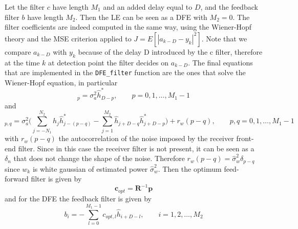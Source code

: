 \documentclass[10pt]{article}
\begin{document}
Let the filter $c$ have length $M_1$ and an added delay equal to $D$, and the feedback filter $b$ have length $M_2$. Then the LE can be seen as a DFE with $M_2 = 0$. The filter coefficients are indeed computed in the same way, using the Wiener-Hopf theory and the MSE criterion applied to $J = E[|a_{k-D} - y_k|^2]$. Note that we compare $a_{k-D}$ with $y_k$ because of the delay D introduced by the c filter, therefore at the time $k$ at detection point the filter decides on $a_{k-D}$. The final equations that are implemented in the \texttt{DFE\_filter} function are the ones that solve the Wiener-Hopf equation, in particular
\begin{equation}
	[\mathbf{p}]_p = \sigma_a^2 \hat{h}^*_{D-p}, \quad \quad p = 0, 1, \dots, M_1 - 1
\end{equation}
and
\begin{equation}
	[\mathbf{R}]_{p, q} = \sigma_a^2 \bigg(\sum_{j = -N_1}^{N_2}\hat{h}_j \hat{h}^*_{j-(p-q)} - \sum_{j = 1}^{M_2} \hat{h}_{j+D-q}\hat{h}^*_{j+D-p} \bigg) + r_{w}(p-q), \quad \quad p,q = 0, 1, \dots, M_1 - 1
\end{equation}
with $r_w(p-q)$ the autocorrelation of the noise imposed by the receiver front-end filter. Since in this case the receiver filter is not present, it can be seen as a $\delta_n$ that does not change the shape of the noise. Therefore $r_w(p-q) = \hat{\sigma}_w^2 \delta_{p-q}$ since $w_k$ is white gaussian of estimated power $\hat{\sigma}_w^2$. Then the optimum feed-forward filter is given by
\begin{equation}
	\mathbf{c}_{opt} = \mathbf{R}^{-1}\mathbf{p}
\end{equation}
and for the DFE the feedback filter is given by 
\begin{equation}
	b_i = -\sum_{l=0}^{M_1-1} c_{opt, l} \hat{h}_{i+D-l}, \quad \quad i = 1, 2, \dots, M_2
\end{equation}
\end{document}
